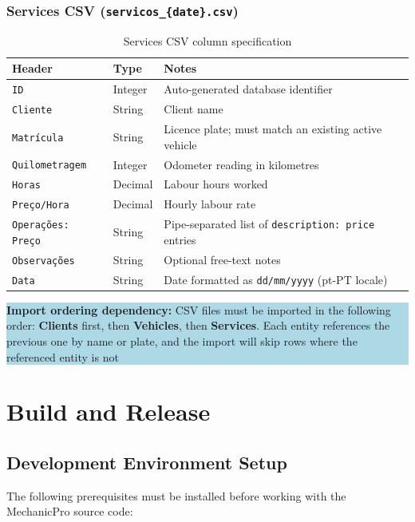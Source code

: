 \documentclass[12pt, a4paper]{report}
\newcommand{\infobox}[1]{%
	\vspace{6pt}
	\noindent
	\colorbox{LightBlue}{%
		\begin{minipage}{\dimexpr\linewidth-2\fboxsep}%
			\vspace{4pt}
			\small #1
			\vspace{4pt}
		\end{minipage}%
	}
	\vspace{6pt}
}
\begin{document}
	\subsection*{Services CSV (\texttt{servicos\_\{date\}.csv})}
	\begin{table}[H]
		\centering
		\begin{tabularx}{\textwidth}{l l X}
			\toprule
			\textbf{Header}          & \textbf{Type}   & \textbf{Notes} \\
			\midrule
			\texttt{ID}              & Integer & Auto-generated database identifier \\
			\texttt{Cliente}         & String  & Client name \\
			\texttt{Matrícula}       & String  & Licence plate; must match an existing active vehicle \\
			\texttt{Quilometragem}   & Integer & Odometer reading in kilometres \\
			\texttt{Horas}           & Decimal & Labour hours worked \\
			\texttt{Preço/Hora}      & Decimal & Hourly labour rate \\
			\texttt{Operações: Preço}& String  & Pipe-separated list of \texttt{description: price} entries \\
			\texttt{Observações}     & String  & Optional free-text notes \\
			\texttt{Data}            & String  & Date formatted as \texttt{dd/mm/yyyy} (pt-PT locale) \\
			\bottomrule
		\end{tabularx}
		\caption{Services CSV column specification}
	\end{table}

	\infobox{\textbf{Import ordering dependency:} CSV files must be imported in
		the following order: \textbf{Clients} first, then \textbf{Vehicles},
		then \textbf{Services}. Each entity references the previous one by name
		or plate, and the import will skip rows where the referenced entity is
		not}
    
	\chapter{Build and Release}

	\section{Development Environment Setup}
	The following prerequisites must be installed before working with the
	MechanicPro source code:
\end{document}
